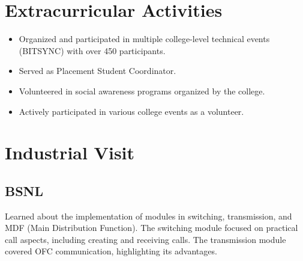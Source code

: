 \documentclass[11pt]{article}
\begin{document}
\section{Extracurricular Activities}
\begin{itemize}
    \item Organized and participated in multiple college-level technical events (BITSYNC) with over 450 participants.
    \item Served as Placement Student Coordinator.
    \item Volunteered in social awareness programs organized by the college.
    \item Actively participated in various college events as a volunteer.
\end{itemize}

\section{Industrial Visit}
\subsection{BSNL}
Learned about the implementation of modules in switching, transmission, and MDF (Main Distribution Function). The switching module focused on practical call aspects, including creating and receiving calls. The transmission module covered OFC communication, highlighting its advantages.
\end{document}
